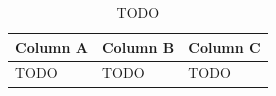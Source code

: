 \begin{table}[t]
\centering
\caption{TODO}
\label{tab:todo}
\begin{tabular}{lll}
\toprule
Column A & Column B & Column C \\
\midrule
TODO & TODO & TODO \\
\bottomrule
\end{tabular}
\end{table}
